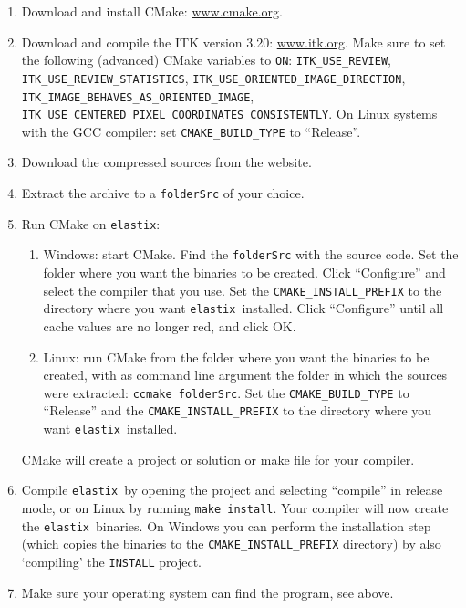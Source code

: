 \documentclass[]{report}
\newcommand{\elastix}{\texttt{elastix}}
\begin{document}
\begin{enumerate}
\item Download and install CMake: \url{www.cmake.org}.

\item Download and compile the ITK version 3.20: \url{www.itk.org}.
Make sure to set the following (advanced) CMake variables to
\texttt{ON}: \texttt{ITK\_USE\_REVIEW},
\texttt{ITK\_USE\_REVIEW\_STATISTICS},
\texttt{ITK\_USE\_ORIENTED\_IMAGE\_DIRECTION},
\texttt{ITK\_IMAGE\_BEHAVES\_AS\_ORIENTED\_IMAGE},
\texttt{ITK\_USE\_CENTERED\_PIXEL\_COORDINATES\_CONSISTENTLY}. On
Linux systems with the GCC compiler: set \texttt{CMAKE\_BUILD\_TYPE}
to ``Release''.

\item Download the compressed sources from the website.

\item Extract the archive to a \texttt{folderSrc} of your choice.

\item Run CMake on \elastix:
    \begin{enumerate}
    \item Windows: start CMake. Find the \texttt{folderSrc} with the
    source code. Set the folder where you want the binaries to be
    created. Click ``Configure'' and select the compiler that you
    use. Set the \texttt{CMAKE\_INSTALL\_PREFIX} to the directory
    where you want \elastix\ installed. Click ``Configure'' until
    all cache values are no longer red, and click OK.

    \item Linux: run CMake from the folder where you want the
    binaries to be created, with as command line argument the folder
    in which the sources were extracted: \texttt{ccmake folderSrc}.
    Set the \texttt{CMAKE\_BUILD\_TYPE} to ``Release'' and the
    \texttt{CMAKE\_INSTALL\_PREFIX} to the directory where you want
    \elastix\ installed.
    \end{enumerate}
CMake will create a project or solution or make file for your
compiler.

\item Compile \elastix\ by opening the project and selecting ``compile'' in
    release mode, or on Linux by running \texttt{make install}. Your
    compiler will now create the \elastix\ binaries. On Windows you can
    perform the installation step (which copies the binaries to the
    \texttt{CMAKE\_INSTALL\_PREFIX} directory) by also `compiling' the
    \texttt{INSTALL} project.

\item Make sure your operating system can find the program, see
above.
\end{enumerate}
\end{document}
